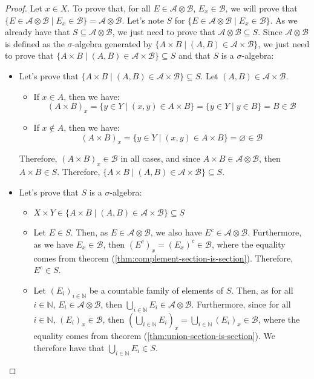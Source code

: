 \documentclass{article}
\theoremstyle{definition}
\theoremstyle{remark}
\theoremstyle{example}
\theoremstyle{notation}
\begin{document}
\begin{proof}
		Let $x \in X$. To prove that, for all $E \in \mathcal{A} \otimes \mathcal{B}$, $E_x \in \mathcal{B}$, we will prove that $\{E \in \mathcal{A} \otimes \mathcal{B} \mid E_x \in \mathcal{B}\} = \mathcal{A} \otimes \mathcal{B}$. Let's note $S$ for $\{E \in \mathcal{A} \otimes \mathcal{B} \mid E_x \in \mathcal{B}\}$. As we already have that $S \subseteq \mathcal{A} \otimes \mathcal{B}$, we just need to prove that $\mathcal{A} \otimes \mathcal{B} \subseteq S$. Since $\mathcal{A} \otimes \mathcal{B}$ is defined as the $\sigma$-algebra generated by $\{A \times B \mid (A, B) \in \mathcal{A} \times \mathcal{B}\}$, we just need to prove that $\{A \times B \mid (A, B) \in \mathcal{A} \times \mathcal{B}\} \subseteq S$ and that $S$ is a $\sigma$-algebra:
		\begin{itemize}
				\item Let's prove that  $\{A \times B \mid (A, B) \in \mathcal{A} \times \mathcal{B}\} \subseteq S$. Let $(A, B) \in \mathcal{A} \times \mathcal{B}$. 
				\begin{itemize}
						\item If $x \in A$, then we have:
								$$(A \times B)_x = \{y \in Y \mid (x, y) \in A \times B\} = \{y \in Y \mid y \in B\} = B \in \mathcal{B}$$
						\item If $x \notin A$, then we have:
								$$(A \times B)_x = \{y \in Y \mid (x, y) \in A \times B\} = \varnothing \in \mathcal{B}$$
				\end{itemize}
				Therefore, $(A \times B)_x \in \mathcal{B}$ in all cases, and since $A \times B \in \mathcal{A} \otimes \mathcal{B}$, then $A \times B \in S$. Therefore, $\{A \times B \mid (A, B) \in \mathcal{A} \times \mathcal{B}\} \subseteq S$.
				\item Let's prove that $S$ is a $\sigma$-algebra:
				\begin{itemize}
						\item $X \times Y \in \{A \times B \mid (A, B) \in \mathcal{A} \times \mathcal{B}\} \subseteq S$
						\item Let $E \in S$. Then, as $E \in \mathcal{A} \otimes \mathcal{B}$, we also have $E^c \in \mathcal{A} \otimes \mathcal{B}$. Furthermore, as we have $E_x \in \mathcal{B}$, then $(E^c)_x = (E_x)^c \in \mathcal{B}$, where the equality comes from theorem (\ref{thm:complement-section-is-section}). Therefore, $E^c \in S$.
						\item Let $(E_i)_{i\in\mathbb{N}}$ be a countable family of elements of $S$. Then, as for all $i \in \mathbb{N}$, $E_i \in \mathcal{A} \otimes \mathcal{B}$, then $\bigcup_{i \in \mathbb{N}} E_i \in \mathcal{A} \otimes \mathcal{B}$. Furthermore, since for all $i \in \mathbb{N}$, $(E_i)_x \in \mathcal{B}$, then $(\bigcup_{i\in\mathbb{N}} E_i)_x = \bigcup_{i\in\mathbb{N}} (E_i)_x \in \mathcal{B}$, where the equality comes from theorem (\ref{thm:union-section-is-section}). We therefore have that $\bigcup_{i\in\mathbb{N}} E_i \in S$.

\end{itemize}
\end{itemize}
\end{proof}
\end{document}
